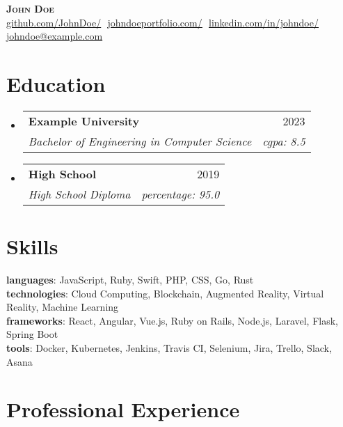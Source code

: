 \documentclass[letterpaper,11pt]{article}%
\makeatletter
\newcommand{\resumeSubheading}[4]{
  \vspace{-2pt}\item
    \begin{tabular*}{0.97\textwidth}[t]{l@{\extracolsep{\fill}}r}
      \textbf{#1} & #2 \\
      \textit{\small#3} & \textit{\small #4} \\
    \end{tabular*}\vspace{-7pt}
}
\newcommand{\resumeSubHeadingListStart}{\begin{itemize}[leftmargin=0.15in, label={}]}
\newcommand{\resumeSubHeadingListEnd}{\end{itemize}}
\makeatother
\begin{document}
%
\normalsize%

\begin{flushright}
\end{flushright}

\begin{center}
    \textbf{\Huge \scshape John Doe} \\ \vspace{8pt}
    \small %
 \href{https://github.com/JohnDoe/}{\underline{github.com/JohnDoe/}} $ $
 \href{https://johndoeportfolio.com/}{\underline{johndoeportfolio.com/}} $ $
 \href{https://www.linkedin.com/in/johndoe/}{\underline{linkedin.com/in/johndoe/}} $ $
 \href{mailto:johndoe@example.com}{\underline{johndoe@example.com}}%
\end{center}%
\section{Education}%
\label{sec:Education}%

%
\resumeSubHeadingListStart%
\resumeSubheading{Example University}{2023}{Bachelor of Engineering in Computer Science}{cgpa: 8.5}%
\vspace*{4pt}%
\resumeSubheading{High School}{2019}{High School Diploma}{percentage: 95.0}%
\resumeSubHeadingListEnd%
\section{Skills}%
\label{sec:Skills}%

%
\begin{itemize}[leftmargin=0.15in, label={}]%
\small{\item{\textbf{languages}{: JavaScript, Ruby, Swift, PHP, CSS, Go, Rust} \\
\textbf{technologies}{: Cloud Computing, Blockchain, Augmented Reality, Virtual Reality, Machine Learning} \\
\textbf{frameworks}{: React, Angular, Vue.js, Ruby on Rails, Node.js, Laravel, Flask, Spring Boot} \\
\textbf{tools}{: Docker, Kubernetes, Jenkins, Travis CI, Selenium, Jira, Trello, Slack, Asana} \\}}%
\end{itemize}%
\section{Professional Experience}%
\label{sec:ProfessionalExperience}%
\end{document}

